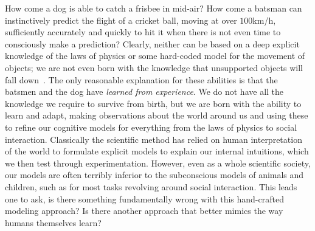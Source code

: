 
How come a dog is able to catch a
frisbee in mid-air? How come a batsman can instinctively predict the flight of a cricket ball,
moving at over $100$km/h, sufficiently accurately and quickly to hit it when there
is not even time to consciously make a prediction?  Clearly, neither can be based on a
deep explicit knowledge of the laws of physics or some hard-coded model for the movement
of objects; we are not even born with the knowledge that unsupported objects will 
fall down~\citep{baillargeon2002acquisition}.  The only reasonable explanation for these
abilities is that the batsmen and the dog have \emph{learned from experience}.  We do not have
all the knowledge we require to survive from birth, but we are born with the
ability to learn and adapt, making observations about the world around us and using these
to refine our cognitive models for everything from the laws of physics to social interaction.
Classically the scientific method has relied on human interpretation of the world to formulate
explicit models to explain our internal intuitions, which we then test
through experimentation.  However, even as a whole scientific society, our models
are often terribly inferior to the subconscious models of animals and children, such as for most
tasks revolving around social interaction.  This leads one to ask, is there something fundamentally
wrong with this hand-crafted modeling approach?  Is there another approach that better mimics the
way humans themselves learn?

